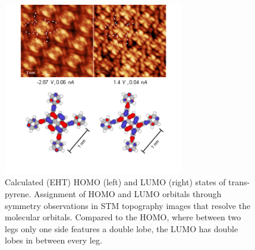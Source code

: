 



\begin{figure}[]\centering
	\includegraphics[width=0.7\textwidth]{./images/paper/pyrene/figure-S4}
	\caption{Calculated (EHT) HOMO (left) and LUMO (right) states of trans-pyrene. Assignment of HOMO and LUMO orbitals through symmetry observations in STM topography images that resolve the molecular orbitals. Compared to the HOMO, where between two legs only one side features a double lobe, the LUMO has double lobes in between every leg.}
	\label{fig:pyene-S4}
\end{figure}

